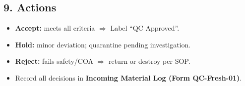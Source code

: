 \subsection*{9. Actions}
\begin{itemize}\setlength\itemsep{2pt}
  \item \textbf{Accept:} meets all criteria $\Rightarrow$ Label ``QC Approved''.
  \item \textbf{Hold:} minor deviation; quarantine pending investigation.
  \item \textbf{Reject:} fails safety/COA $\Rightarrow$ return or destroy per SOP.
  \item Record all decisions in \textbf{Incoming Material Log (Form QC-Fresh-01)}.
\end{itemize}